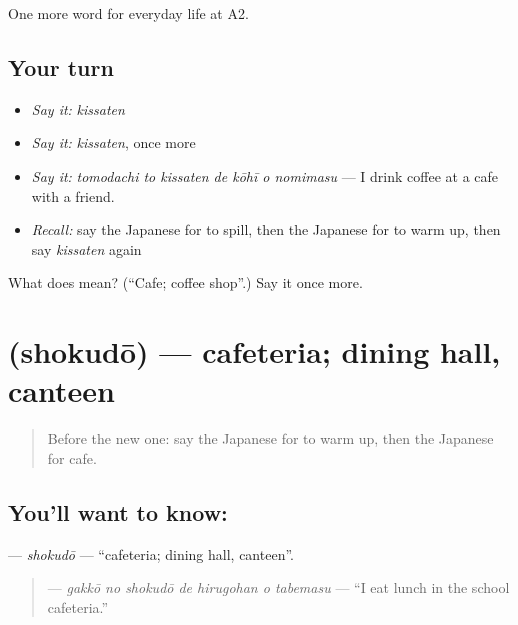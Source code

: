 \begin{grammarlens}[title={What you've built}]
One more word for everyday life at A2.
\end{grammarlens}

\subsection*{Your turn}
\begin{itemize}
\raggedright
  \item \emph{Say it:} \emph{kissaten}
  \item \emph{Say it:} \emph{kissaten}, once more
  \item \emph{Say it:} \emph{tomodachi to kissaten de kōhī o nomimasu} — I drink coffee at a cafe with a friend.
  \item \emph{Recall:} say the Japanese for to spill, then the Japanese for to warm up, then say \emph{kissaten} again
\end{itemize}

\begin{tcolorbox}[breakable,colback=teal!4,colframe=teal!35!black,title={Before you move on}]
What does  mean? (\textquotedblleft{}Cafe; coffee shop\textquotedblright{}.) Say it once more.
\end{tcolorbox}
\section[\texorpdfstring{\ja{しょくどう} (shokudō)}{しょくどう (shokudō)}]{ (shokudō) — cafeteria; dining hall, canteen}

\label{lesson:JA-C180-shokudou}



\begin{quote}
Before the new one: say the Japanese for to warm up, then the Japanese for cafe.
\end{quote}

\subsection*{You'll want to know: }
\textbf{} — \emph{shokudō} — \textquotedblleft{}cafeteria; dining hall, canteen\textquotedblright{}.

\begin{quote}
\textbf{   } — \emph{gakkō no shokudō de hirugohan o tabemasu} — \textquotedblleft{}I eat lunch in the school cafeteria.\textquotedblright{}
\end{quote}

